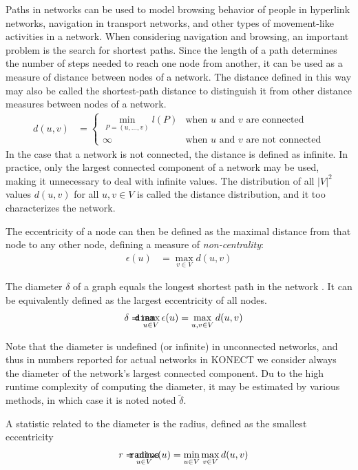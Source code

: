 \documentclass{article}
\def\mathnote#1{%
  \tag*{\rlap{\hspace\marginparsep\smash{\parbox[t]{\marginparwidth}{#1}}}}
}
\begin{document}
Paths in networks can be used to model browsing behavior of people in
hyperlink networks, navigation in transport networks, and other types of
movement-like activities in a network.  When considering navigation and
browsing, an important problem is the search for shortest paths.  Since
the length of a path determines the number of steps needed to reach one
node from another, it can be used as a measure of distance between nodes
of a network.  The distance defined in this way may also be called the
shortest-path distance to distinguish it from other distance measures
between nodes of a network.
\begin{align}
  d(u, v) &= \left\{ \begin{array} {ll} \min_{P=(u, \dotsc, v)} l(P) &
    \text{when $u$ and $v$ are connected} \\ \infty & \text{when $u$ and
      $v$ are not connected}
  \end{array} \right. 
\end{align}
In the case that a network is not connected, the distance is defined as
infinite.  In practice, only the largest connected component of a
network may be used, making it unnecessary to deal with infinite values.
The distribution of all $|V|^2$ values $d(u,v)$ for all $u,v\in V$ is
called the distance distribution, and it too characterizes the network.

The eccentricity of a node can then be defined as the maximal distance
from that node to any other node, defining a measure of
\emph{non-centrality}:
\begin{align}
  \epsilon(u) &= \max_{v\in V} d(u,v)
\end{align}

The diameter $\delta$ of a graph equals the longest shortest path in the
network \citep{b779}.  It can be equivalently defined as the largest eccentricity of
all nodes.
\begin{align}
  \mathnote{\texttt{diam}} \delta &= \max_{u \in V} \epsilon(u) =
  \max_{u,v \in V} d(u,v)
\end{align}

Note that the diameter is undefined (or infinite) in unconnected
networks, and thus in numbers reported for actual networks in KONECT we
consider always the diameter of the network's largest connected
component.  Du to the high runtime complexity of computing the diameter,
it may be estimated by various methods, in which case it is noted noted
$\tilde \delta$.

A statistic related to the diameter is the radius, defined as the
smallest eccentricity
\begin{align}
  \mathnote{\texttt{radius}} r &= \min_{u \in V} \epsilon(u) = \min_{u
    \in V} \max_{v \in V} d(u,v)
\end{align}
\end{document}
